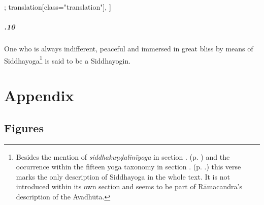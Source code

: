 \begin{alignment}[
  texts=edition[class="edition"];
  translation[class="translation"],
  ]
\begin{translation}
\begin{tlate}[44_10]
      \paragraph{.10} One who is always indifferent, peaceful and immersed in great bliss by means of Siddhayoga\footnote{Besides the mention of \textit{siddhakuṇḍalinīyoga} in section . (p. \pageref{siddhayoga}) and the occurrence within the fifteen yoga taxonomy in section . (p. \pageref{intro}.) this verse marks the only description of Siddhayoga in the whole text. It is not introduced within its own section and seems to be part of Rāmacandra's description of the Avadhūta.} is said to be a Siddhayogin.
    \end{tlate}
  \end{translation}
\end{alignment}
\pagebreak %
\cleardoublepage
{}
\chapter{Appendix}
\section{Figures}

